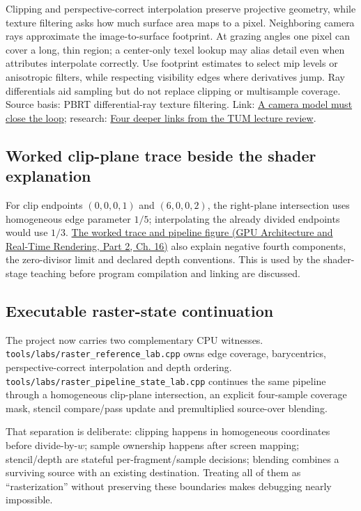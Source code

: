 Clipping and perspective-correct interpolation preserve projective geometry, while texture filtering asks how much surface area maps to a pixel. Neighboring camera rays approximate the image-to-surface footprint. At grazing angles one pixel can cover a long, thin region; a center-only texel lookup may alias detail even when attributes interpolate correctly. Use footprint estimates to select mip levels or anisotropic filters, while respecting visibility edges where derivatives jump. Ray differentials aid sampling but do not replace clipping or multisample coverage. Source basis: PBRT differential-ray texture filtering. Link: \hyperref[02-foundations-ii-ch037-a-camera-model-must-close-the-loop]{A camera model must close the loop}; research: \hyperref[02-foundations-ii-ch036-four-deeper-links-from-the-tum-lecture-review]{Four deeper links from the TUM lecture review}.

\subsection{Worked clip-plane trace beside the shader explanation}\label{appendix-40426e4b2103-worked-clip-plane-trace-beside-the-shader-explanation}

\hypertarget{appendix-40426e4b2103-worked-clip-plane-trace-beside-the-shader-explanation}{}

For clip endpoints \((0,0,0,1)\) and \((6,0,0,2)\), the right-plane intersection uses homogeneous edge parameter \(1/5\); interpolating the already divided endpoints would use \(1/3\). \href{../06-GPU-Architecture-and-Real-Time-Rendering-P02/main.pdf\#nameddest=06-engine-ii-ch025-clip-coordinates-are-not-normalized-device-coordinates}{The worked trace and pipeline figure (GPU Architecture and Real-Time Rendering, Part 2, Ch. 16)} also explain negative fourth components, the zero-divisor limit and declared depth conventions. This is used by the shader-stage teaching before program compilation and linking are discussed.

\subsection{Executable raster-state continuation}\label{appendix-40426e4b2103-executable-raster-state-continuation}

\hypertarget{appendix-40426e4b2103-executable-raster-state-continuation}{}

The project now carries two complementary CPU witnesses. \texttt{tools/labs/raster\_reference\_lab.cpp} owns edge coverage, barycentrics, perspective-correct interpolation and depth ordering. \texttt{tools/labs/raster\_pipeline\_state\_lab.cpp} continues the same pipeline through a homogeneous clip-plane intersection, an explicit four-sample coverage mask, stencil compare/pass update and premultiplied source-over blending.

That separation is deliberate: clipping happens in homogeneous coordinates before divide-by-\(w\); sample ownership happens after screen mapping; stencil/depth are stateful per-fragment/sample decisions; blending combines a surviving source with an existing destination. Treating all of them as ``rasterization'' without preserving these boundaries makes debugging nearly impossible.
